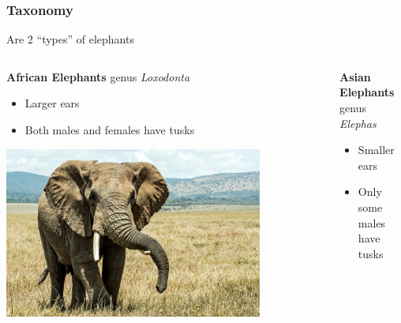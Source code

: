 \documentclass[10pt]{beamer}
\begin{document}
\begin{frame}[t]
\frametitle{Taxonomy}
\vspace{0.25cm}

	\begin{center}
		Are 2 ``types'' of elephants\\
	\end{center}	
	
	\vspace{0.25cm}
	
	\begin{columns}[t]
		\begin{column}{0.5\textwidth}
			\textbf{\textcolor{myblue}{African Elephants}} genus \emph{Loxodonta}\\
			
			\begin{itemize}
				\item Larger ears
				\item Both males and females have tusks
			\end{itemize}
			
			\vspace{0.25cm}
			
			\begin{center}
				\includegraphics[width=0.8\textwidth]{figures/african.jpg}
			\end{center}
		\end{column}
		
		\begin{column}{0.5\textwidth}
			\textbf{\textcolor{myblue}{Asian Elephants}} genus \emph{Elephas}
			
			\begin{itemize}
				\item Smaller ears
				\item Only some males have tusks
			\end{itemize}
			

\end{column}
\end{columns}
\end{frame}
\end{document}
